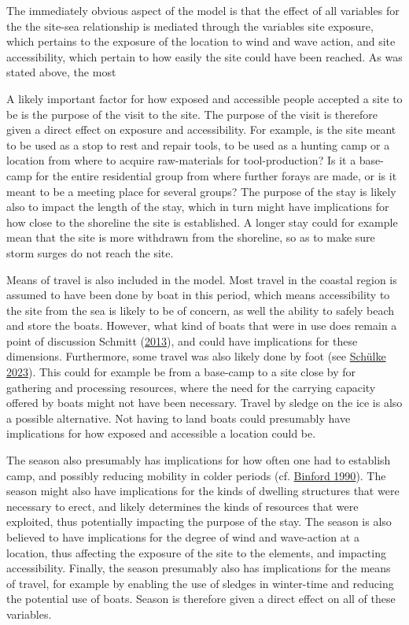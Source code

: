 \documentclass[
  12pt,
  a4paper,
  oneside]{book}
\begin{document}
The immediately obvious aspect of the model is that the effect of all variables for the the site-sea relationship is mediated through the variables site exposure, which pertains to the exposure of the location to wind and wave action, and site accessibility, which pertain to how easily the site could have been reached. As was stated above, the most

A likely important factor for how exposed and accessible people accepted a site to be is the purpose of the visit to the site. The purpose of the visit is therefore given a direct effect on exposure and accessibility. For example, is the site meant to be used as a stop to rest and repair tools, to be used as a hunting camp or a location from where to acquire raw-materials for tool-production? Is it a base-camp for the entire residential group from where further forays are made, or is it meant to be a meeting place for several groups? The purpose of the stay is likely also to impact the length of the stay, which in turn might have implications for how close to the shoreline the site is established. A longer stay could for example mean that the site is more withdrawn from the shoreline, so as to make sure storm surges do not reach the site.

Means of travel is also included in the model. Most travel in the coastal region is assumed to have been done by boat in this period, which means accessibility to the site from the sea is likely to be of concern, as well the ability to safely beach and store the boats. However, what kind of boats that were in use does remain a point of discussion Schmitt (\protect\hyperlink{ref-schmitt2013}{2013}), and could have implications for these dimensions. Furthermore, some travel was also likely done by foot (see \protect\hyperlink{ref-schulke2023}{Schülke 2023}). This could for example be from a base-camp to a site close by for gathering and processing resources, where the need for the carrying capacity offered by boats might not have been necessary. Travel by sledge on the ice is also a possible alternative. Not having to land boats could presumably have implications for how exposed and accessible a location could be.

The season also presumably has implications for how often one had to establish camp, and possibly reducing mobility in colder periods (cf. \protect\hyperlink{ref-binford1990}{Binford 1990}). The season might also have implications for the kinds of dwelling structures that were necessary to erect, and likely determines the kinds of resources that were exploited, thus potentially impacting the purpose of the stay. The season is also believed to have implications for the degree of wind and wave-action at a location, thus affecting the exposure of the site to the elements, and impacting accessibility. Finally, the season presumably also has implications for the means of travel, for example by enabling the use of sledges in winter-time and reducing the potential use of boats. Season is therefore given a direct effect on all of these variables.
\end{document}

